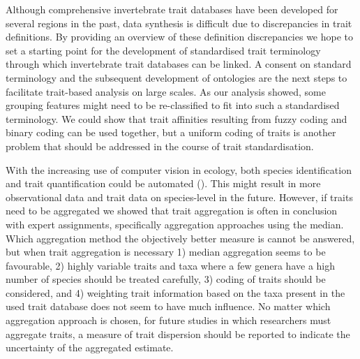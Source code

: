\documentclass{article}
\begin{document}
Although comprehensive invertebrate trait databases have been developed for several regions in the past, data synthesis is difficult due to discrepancies in trait definitions. By providing an overview of these definition discrepancies we hope to set a starting point for the development of standardised trait terminology through which invertebrate trait databases can be linked. A consent on standard terminology and the subsequent development of ontologies are the next steps to facilitate trait-based analysis on large scales. As our analysis showed, some grouping features might need to be re-classified to fit into such a standardised terminology. We could show that trait affinities resulting from fuzzy coding and binary coding can be used together, but a uniform coding of traits is another problem that should be addressed in the course of trait standardisation.  

With the increasing use of computer vision in ecology, both species identification and trait quantification could be automated (\cite{milosevic_application_2020, hoye_deep_2020}). This might result in more observational data and trait data on species-level in the future. However, if traits need to be aggregated we showed that trait aggregation is often in conclusion with expert assignments, specifically aggregation approaches using the median. Which aggregation method the objectively better measure is cannot be answered, but when trait aggregation is necessary 1) median aggregation seems to be favourable, 2) highly variable traits and taxa where a few genera have a high number of species should be treated carefully, 3) coding of traits should be considered, and 4) weighting trait information based on the taxa present in the used trait database does not seem to have much influence. No matter which aggregation approach is chosen, for future studies in which researchers must aggregate traits, a measure of trait dispersion should be reported to indicate the uncertainty of the aggregated estimate. 
\end{document}
